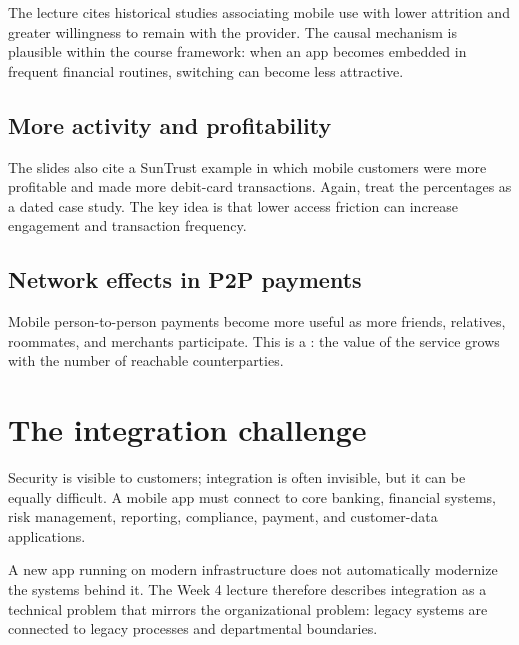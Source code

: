 The lecture cites historical studies associating mobile use with lower attrition and greater willingness to remain with the provider. The causal mechanism is plausible within the course framework: when an app becomes embedded in frequent financial routines, switching can become less attractive.

\subsection{More activity and profitability}

The slides also cite a SunTrust example in which mobile customers were more profitable and made more debit-card transactions. Again, treat the percentages as a dated case study. The key idea is that lower access friction can increase engagement and transaction frequency.

\subsection{Network effects in P2P payments}

Mobile person-to-person payments become more useful as more friends, relatives, roommates, and merchants participate. This is a : the value of the service grows with the number of reachable counterparties.

\section{The integration challenge}

Security is visible to customers; integration is often invisible, but it can be equally difficult. A mobile app must connect to core banking, financial systems, risk management, reporting, compliance, payment, and customer-data applications.

A new app running on modern infrastructure does not automatically modernize the systems behind it. The Week 4 lecture therefore describes integration as a technical problem that mirrors the organizational problem: legacy systems are connected to legacy processes and departmental boundaries.

\begin{mlfigure}
\end{mlfigure}

